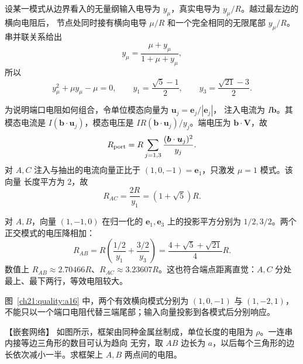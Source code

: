 {\begin{xesolution}
\par\noindent\begin{minipage}{\linewidth}
\threeRailModesFigure
{}
\end{minipage}\par\medskip

设某一模式从边界看入的无量纲输入电导为 $y_\mu$，真实电导为 $y_\mu/R$。越过最左边的横向电阻后，
节点处同时接有横向电导 $\mu/R$ 和一个完全相同的无限尾部 $y_\mu/R$。串并联关系给出
\[
  y_\mu=\frac{\mu+y_\mu}{1+\mu+y_\mu},
\]
所以
\[
  y_\mu^2+\mu y_\mu-\mu=0,
  \qquad
  y_1=\frac{\sqrt5-1}{2},
  \qquad
  y_3=\frac{\sqrt{21}-3}{2}.
\]

为说明端口电阻如何组合，令单位模态向量为 $\boldsymbol u_j=\boldsymbol e_j/|\boldsymbol e_j|$，
注入电流为 $I\boldsymbol b$。其模态电流是 $I(\boldsymbol b\cdot\boldsymbol u_j)$，模态电压是
$IR(\boldsymbol b\cdot\boldsymbol u_j)/y_j$。端电压为 $\boldsymbol b\cdot\boldsymbol V$，故
\[
 R_{\rm port}=R\sum_{j=1,3}\frac{(\boldsymbol b\cdot\boldsymbol u_j)^2}{y_j}.
\]
对 $A,C$ 注入与抽出的电流向量正比于 $(1,0,-1)=\boldsymbol e_1$，只激发 $\mu=1$ 模式。该向量
长度平方为 $2$，故
\[
  \boxed{R_{AC}=\frac{2R}{y_1}=(1+\sqrt5)R}.
\]

对 $A,B$，向量 $(1,-1,0)$ 在归一化的 $\boldsymbol e_1,\boldsymbol e_3$ 上的投影平方分别为
$1/2,3/2$。两个正交模式的电压降相加：
\[
  R_{AB}=R\left(\frac{1/2}{y_1}+\frac{3/2}{y_3}\right)
  =\boxed{\frac{4+\sqrt5+\sqrt{21}}4R}.
\]
数值上 $R_{AB}\approx2.70466R$、$R_{AC}\approx3.23607R$。这也符合端点距离直觉：$A,C$ 分处
最上、最下两行，等效电阻较大。

图~\ref{ch21:quality:a16} 中，两个有效横向模式分别为 $(1,0,-1)$ 与 $(1,-2,1)$，不能只以一个端口电阻代替三端尾部；输入向量投影到各模式后分别响应。
\end{xesolution}



\begin{origexamplebox}{【嵌套网络】}\label{ch21:ex:s37-6-9}
如图所示，框架由同种金属丝制成，单位长度的电阻为 $\rho$。一连串内接等边三角形的数目可认为趋向
无穷，取 $AB$ 边长为 $a$，以后每个三角形的边长依次减小一半。求框架上 $A,B$ 两点间的电阻。
\par\noindent\begin{minipage}{\linewidth}
\nestedTriangleProblemFigure
{}
\end{minipage}\par\medskip
\end{origexamplebox}\par\nopagebreak[4]


}
